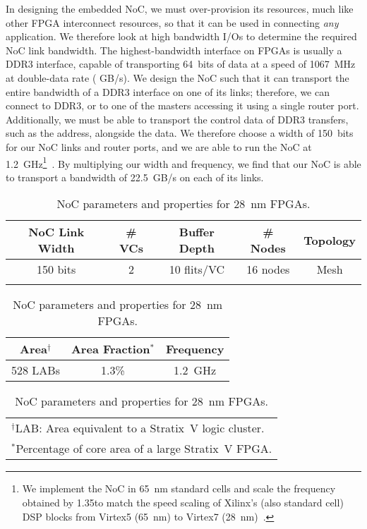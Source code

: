 In designing the embedded NoC, we must over-provision its resources, much like other FPGA interconnect resources, so that it can be used in connecting \textit{any} application.
We therefore look at high bandwidth I/Os to determine the required NoC link bandwidth.
The highest-bandwidth interface on FPGAs is usually a DDR3 interface, capable of transporting 64~bits of data at a speed of 1067~MHz at double-data rate ( GB/s).
We design the NoC such that it can transport the entire bandwidth of a DDR3 interface on one of its links; therefore, we can connect to DDR3, or to one of the masters accessing it using a single router port.
Additionally, we must be able to transport the control data of DDR3 transfers, such as the address, alongside the data.
We therefore choose a width of 150~bits for our NoC links and router ports, and we are able to run the NoC at 1.2~GHz\footnote{We implement the NoC in 65~nm standard cells and scale the frequency obtained by 1.35\xx to match the speed scaling of Xilinx's (also standard cell) DSP blocks from Virtex5 (65~nm) to Virtex7 (28~nm)~\cite{xilinx_datasheets}.}~\cite{noc_designer}.
By multiplying our width and frequency, we find that our NoC is able to transport a bandwidth of 22.5~GB/s on each of its links.

%
%
\begin{table}[!t]
\centering
\begin{small}
\setlength{\tabcolsep}{3.5pt}
    \caption{NoC parameters and properties for 28~nm FPGAs.}
    \label{noc_params}
    \begin{tabular}{ccccc}
    \toprule
    NoC Link Width & \# VCs & Buffer Depth & \# Nodes & Topology\\
    \midrule
	150 bits &       2       &	 10 flits/VC     &      16 nodes & Mesh \\
    \bottomrule
	\\
    \end{tabular}
\setlength{\tabcolsep}{6pt}
    \begin{tabular}{ccc}
    \toprule
    Area$^\dagger$  & Area Fraction$^*$ & Frequency   \\
    \midrule
	       528 LABs          &      1.3\%       &	 1.2~GHz    \\
    \bottomrule
    \end{tabular}
    \begin{tabular}{ccc}
	\multicolumn{3}{l}{$^\dagger$LAB: Area equivalent to a Stratix~V logic cluster.}\\
	\multicolumn{3}{l}{$^*$Percentage of core area of a large Stratix~V FPGA.}\\
    \end{tabular}
\end{small}
\end{table}
%
%

